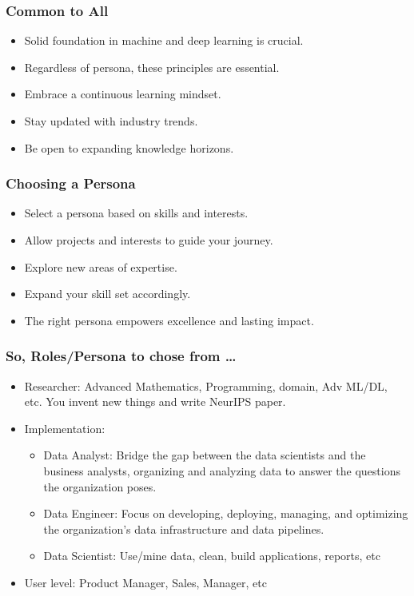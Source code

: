 \begin{frame}[fragile]\frametitle{Common to All}
        \begin{itemize}
            \item Solid foundation in machine and deep learning is crucial.
            \item Regardless of persona, these principles are essential.
            \item Embrace a continuous learning mindset.
            \item Stay updated with industry trends.
            \item Be open to expanding knowledge horizons.
        \end{itemize}
\end{frame}

\begin{frame}[fragile]\frametitle{Choosing a Persona}
        \begin{itemize}
            \item Select a persona based on skills and interests.
            \item Allow projects and interests to guide your journey.
            \item Explore new areas of expertise.
            \item Expand your skill set accordingly.
            \item The right persona empowers excellence and lasting impact.
        \end{itemize}
\end{frame}


\begin{frame}[fragile]\frametitle{So, Roles/Persona to chose from \ldots}
\begin{itemize}
\item Researcher: Advanced Mathematics, Programming, domain, Adv ML/DL, etc. You invent new things and write NeurIPS paper.
\item Implementation:
	\begin{itemize}
	\item Data Analyst: Bridge the gap between the data scientists and the business analysts, organizing and analyzing data to answer the questions the organization poses. 
	\item Data Engineer: Focus on developing, deploying, managing, and optimizing the organization’s data infrastructure and data pipelines.
	\item Data Scientist: Use/mine data, clean, build applications, reports, etc
	\end{itemize}
\item User level: Product Manager, Sales, Manager, etc
\end{itemize}
\end{frame}
